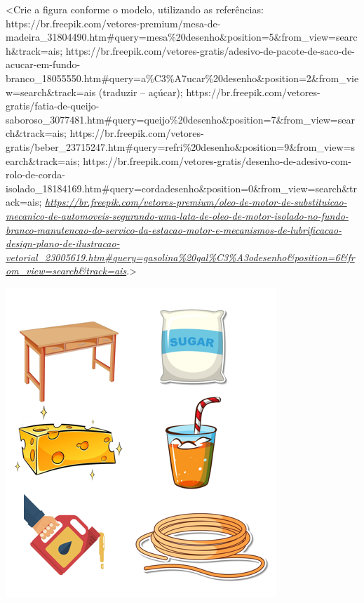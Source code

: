 \textless{}Crie a figura conforme o modelo, utilizando as referências:
https://br.freepik.com/vetores-premium/mesa-de-madeira\_31804490.htm\#query=mesa\%20desenho\&position=5\&from\_view=search\&track=ais;
https://br.freepik.com/vetores-gratis/adesivo-de-pacote-de-saco-de-acucar-em-fundo-branco\_18055550.htm\#query=a\%C3\%A7ucar\%20desenho\&position=2\&from\_view=search\&track=ais
(traduzir -- açúcar);
https://br.freepik.com/vetores-gratis/fatia-de-queijo-saboroso\_3077481.htm\#query=queijo\%20desenho\&position=7\&from\_view=search\&track=ais;
https://br.freepik.com/vetores-gratis/beber\_23715247.htm\#query=refri\%20desenho\&position=9\&from\_view=search\&track=ais;
https://br.freepik.com/vetores-gratis/desenho-de-adesivo-com-rolo-de-corda-isolado\_18184169.htm\#query=cordadesenho\&position=0\&from\_view=search\&track=ais;
\href{https://br.freepik.com/vetores-premium/oleo-de-motor-de-substituicao-mecanico-de-automoveis-segurando-uma-lata-de-oleo-de-motor-isolado-no-fundo-branco-manutencao-do-servico-da-estacao-motor-e-mecanismos-de-lubrificacao-design-plano-de-ilustracao-vetorial_23005619.htm\#query=gasolina\%20gal\%C3\%A3odesenho\&position=6\&from_view=search\&track=ais}{\emph{https://br.freepik.com/vetores-premium/oleo-de-motor-de-substituicao-mecanico-de-automoveis-segurando-uma-lata-de-oleo-de-motor-isolado-no-fundo-branco-manutencao-do-servico-da-estacao-motor-e-mecanismos-de-lubrificacao-design-plano-de-ilustracao-vetorial\_23005619.htm\#query=gasolina\%20gal\%C3\%A3odesenho\&position=6\&from\_view=search\&track=ais}}.\textgreater{}

\includegraphics[width=4.02139in,height=4.59439in]{media/image24.png}

